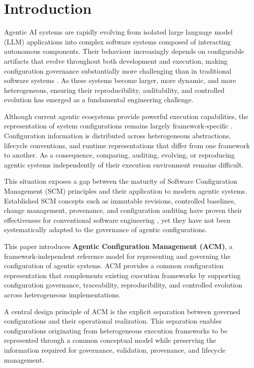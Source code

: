 \documentclass[10pt]{article}
\begin{document}
\section{Introduction}

Agentic AI systems are rapidly evolving from isolated large language model (LLM) applications into complex software systems composed of interacting autonomous components. Their behaviour increasingly depends on configurable artifacts that evolve throughout both development and execution, making configuration governance substantially more challenging than in traditional software systems \cite{ref1}. As these systems become larger, more dynamic, and more heterogeneous, ensuring their reproducibility, auditability, and controlled evolution has emerged as a fundamental engineering challenge.

Although current agentic ecosystems provide powerful execution capabilities, the representation of system configurations remains largely framework-specific \cite{ref2}. Configuration information is distributed across heterogeneous abstractions, lifecycle conventions, and runtime representations that differ from one framework to another. As a consequence, comparing, auditing, evolving, or reproducing agentic systems independently of their execution environment remains difficult.

This situation exposes a gap between the maturity of Software Configuration Management (SCM) principles and their application to modern agentic systems. Established SCM concepts such as immutable revisions, controlled baselines, change management, provenance, and configuration auditing have proven their effectiveness for conventional software engineering \cite{ref3}, yet they have not been systematically adapted to the governance of agentic configurations.

This paper introduces \textbf{Agentic Configuration Management (ACM)}, a framework-independent reference model for representing and governing the configuration of agentic systems. ACM provides a common configuration representation that complements existing execution frameworks by supporting configuration governance, traceability, reproducibility, and controlled evolution across heterogeneous implementations.

A central design principle of ACM is the explicit separation between governed configurations and their operational realization. This separation enables configurations originating from heterogeneous execution frameworks to be represented through a common conceptual model while preserving the information required for governance, validation, provenance, and lifecycle management.
\end{document}
